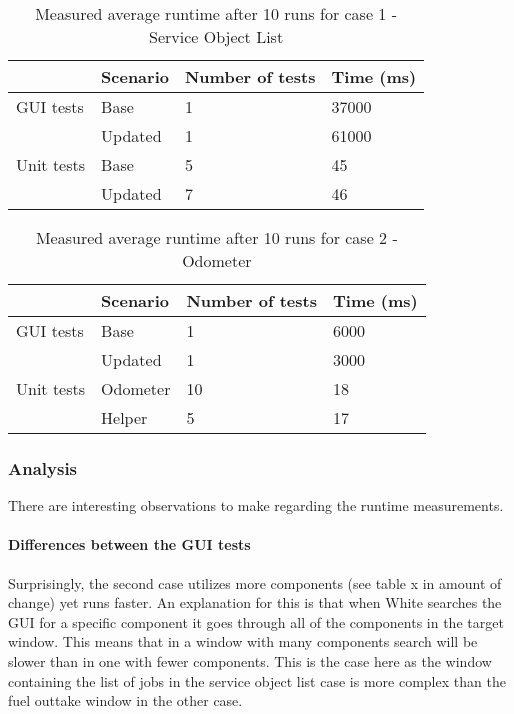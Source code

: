\documentclass{article}
\begin{document}
			\begin{table}[h!]
				\begin{tabular}{l |l |l l}
				        & Scenario & Number of tests & Time (ms)\\
				\hline
				 GUI tests & Base     & 1               & 37000 \\
				        & Updated  & 1    			 & 61000 \\
				\hline
				 Unit tests & Base     & 5               & 45 \\
				 		& Updated  & 7               & 46 \\
				 \end{tabular}
				 \caption{Measured average runtime after 10 runs for case 1 - Service Object List}
			 \end{table}


			\begin{table}[h!]
				\begin{tabular}{l |l |l l}
				        & Scenario & Number of tests & Time (ms)\\
				\hline
				GUI tests & Base     & 1           & 6000 \\
				           & Updated  & 1    		& 3000 \\
				\hline
				Unit tests & Odometer & 10         & 18 \\
				 		& Helper      & 5           & 17 \\
				\end{tabular}
				\caption{Measured average runtime after 10 runs for case 2 - Odometer}
			\end{table}

			\subsubsection{Analysis}
			There are interesting observations to make regarding the runtime measurements. 

			\paragraph{Differences between the GUI tests}
			Surprisingly, the second case utilizes more components (see table x in amount of change) yet runs faster. An explanation for this is that when White searches the GUI for a specific component it goes through all of the components in the target window. This means that in a window with many components search will be slower than in one with fewer components. This is the case here as the window containing the list of jobs in the service object list case is more complex than the fuel outtake window in the other case.
\end{document}
